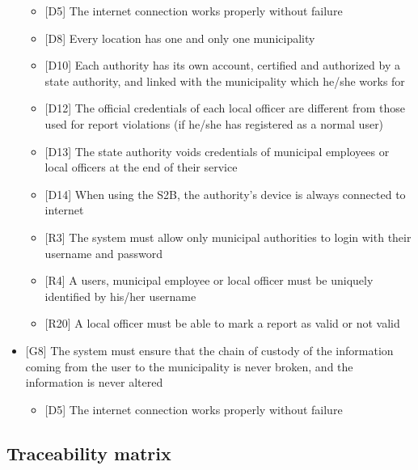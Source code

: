 \begin{itemize}
							\begin{itemize}
								\item {[D5]} The internet connection works properly without failure
								\item {[D8]} Every location has one and only one municipality
								\item {[D10]} Each authority has its own account, certified and authorized by a state authority, and linked with the municipality which he/she works for 
								\item {[D12]} The official credentials of each local officer are different from those used for report violations (if he/she has registered as a normal user)
								\item {[D13]} The state authority voids credentials of municipal employees or local officers at the end of their service
								\item {[D14]} When using the S2B, the authority's device is always connected to internet
								\item {[R3]} The system must allow only municipal authorities to login with their username and password
								\item {[R4]} A users, municipal employee or local officer must be uniquely identified by his/her username
								\item {[R20]} A local officer must be able to mark a report as valid or not valid
							\end{itemize}
						\item {[G8]} The system must ensure that the chain of custody of the information coming from the user to the municipality is never broken, and the information is never altered
							\begin{itemize}
								\item {[D5]} The internet connection works properly without failure
							\end{itemize}
					\end{itemize}
			\subsection{Traceability matrix}
